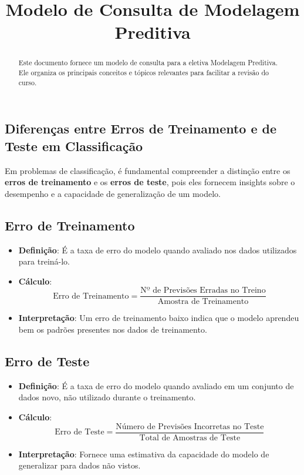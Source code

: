 \documentclass{sciposter}
\title{Modelo de Consulta de Modelagem Preditiva}
\institute 
{Bacharelado em Economia\\
Insper - Instituto de Ensino e Pesquisa\\
São Paulo, Brasil}
\begin{document}

\maketitle

\begin{multicols}{3}

\begin{abstract}
Este documento fornece um modelo de consulta para a eletiva Modelagem Preditiva. Ele organiza os principais conceitos e tópicos relevantes para facilitar a revisão do curso.
\end{abstract}


\section{Diferenças entre Erros de Treinamento e de Teste em Classificação}

Em problemas de classificação, é fundamental compreender a distinção entre os \textbf{erros de treinamento} e os \textbf{erros de teste}, pois eles fornecem insights sobre o desempenho e a capacidade de generalização de um modelo.

\subsection*{Erro de Treinamento}

\begin{itemize}
    \item \textbf{Definição}: É a taxa de erro do modelo quando avaliado nos dados utilizados para treiná-lo.
    \item \textbf{Cálculo}:
    \[
    \text{Erro de Treinamento} = \frac{\text{Nº de Previsões Erradas no Treino}}{\text{Amostra de Treinamento}}
    \]
    \item \textbf{Interpretação}: Um erro de treinamento baixo indica que o modelo aprendeu bem os padrões presentes nos dados de treinamento.
\end{itemize}

\subsection*{Erro de Teste}

\begin{itemize}
    \item \textbf{Definição}: É a taxa de erro do modelo quando avaliado em um conjunto de dados novo, não utilizado durante o treinamento.
    \item \textbf{Cálculo}:
    \[
    \text{Erro de Teste} = \frac{\text{Número de Previsões Incorretas no Teste}}{\text{Total de Amostras de Teste}}
    \]
    \item \textbf{Interpretação}: Fornece uma estimativa da capacidade do modelo de generalizar para dados não vistos.
\end{itemize}


\end{multicols}
\end{document}
